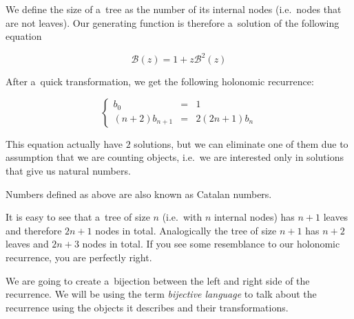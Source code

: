 \documentclass[final]{article}
\theoremstyle{definition}
\theoremstyle{definition}
\theoremstyle{remark}
\newcommand{\gf}[1]{\ensuremath{\mathcal{#1}}}
\begin{document}
We define the size of a~tree as the number of its internal nodes (i.e.~nodes that are not leaves). Our generating function is therefore a~solution of the following equation

\[\gf{B}(z) = 1 + z\gf{B}^2(z)\]

After a~quick transformation, we get the following holonomic recurrence:

\[\left\{\begin{array}{rcl}
            b_0 &=& 1\\
            (n + 2)b_{n + 1} &=& 2 (2n + 1)b_n
\end{array}\right.\]

This equation actually have \(2\) solutions, but we can eliminate one of them due to assumption that we are counting objects, i.e.~we are interested only in solutions that give us natural numbers.

Numbers defined as above are also known as Catalan numbers.

It is easy to see that a~tree of size \(n\) (i.e.~with \(n\) internal nodes) has \(n + 1\) leaves and therefore \(2n + 1\) nodes in total. Analogically the tree of size \(n + 1\) has \(n + 2\) leaves and \(2n + 3\) nodes in total. If you see some resemblance to our holonomic recurrence, you are perfectly right.

We are going to create a~bijection between the left and right side of the recurrence. We will be using the term \textit{bijective language} to talk about the recurrence using the objects it describes and their transformations.
\end{document}
